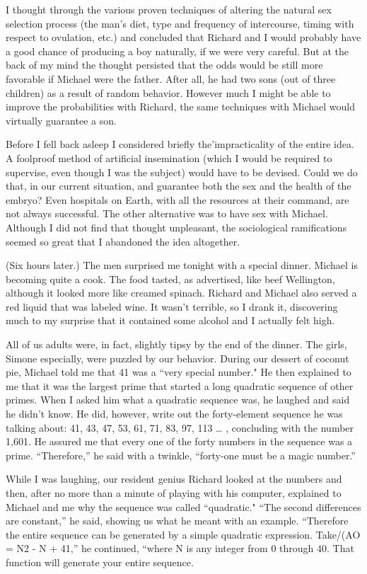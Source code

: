 \documentclass[]{article}
\begin{document}
I thought through the various proven techniques of altering the natural sex selection process (the man’s diet, type and frequency of intercourse, timing with respect to ovulation, etc.) and concluded that Richard and I would probably have a good chance of producing a boy naturally, if we were very careful.  But at the back of my mind the thought persisted that the odds would be still more favorable if Michael were the father.  After all, he had two sons (out of three children) as a result of random behavior.  However much I might be able to improve the probabilities with Richard, the same techniques with Michael would virtually guarantee a son.

Before I fell back asleep I considered briefly the’impracticality of the entire idea.  A foolproof method of artificial insemination (which I would be required to supervise, even though I was the subject) would have to be devised.  Could we do that, in our current situation, and guarantee both the sex and the health of the embryo? Even hospitals on Earth, with all the resources at their command, are not always successful.  The other alternative was to have sex with Michael.  Although I did not find that thought unpleasant, the sociological ramifications seemed so great that I abandoned the idea altogether.

(Six hours later.) The men surprised me tonight with a special dinner.  Michael is becoming quite a cook.  The food tasted, as advertised, like beef Wellington, although it looked more like creamed spinach.  Richard and Michael also served a red liquid that was labeled wine.  It wasn’t terrible, so I drank it, discovering much to my surprise that it contained some alcohol and I actually felt high.

All of us adults were, in fact, slightly tipsy by the end of the dinner.  The girls, Simone especially, were puzzled by our behavior.  During our dessert of coconut pie, Michael told me that 41 was a “very special number."  He then explained to me that it was the largest prime that started a long quadratic sequence of other primes.  When I asked him what a quadratic sequence was, he laughed and said he didn’t know.  He did, however, write out the forty-element sequence he was talking about: 41, 43, 47, 53, 61, 71, 83, 97, 113 … , concluding with the number 1,601.  He assured me that every one of the forty numbers in the sequence was a prime.  “Therefore,” he said with a twinkle, “forty-one must be a magic number.”

While I was laughing, our resident genius Richard looked at the numbers and then, after no more than a minute of playing with his computer, explained to Michael and me why the sequence was called “quadratic."  “The second differences are constant,” he said, showing us what he meant with an example.  “Therefore the entire sequence can be generated by a simple quadratic expression.  Take/(AO = N2 - N + 41,” he continued, “where N is any integer from 0 through 40.  That function will generate your entire sequence.
\end{document}
